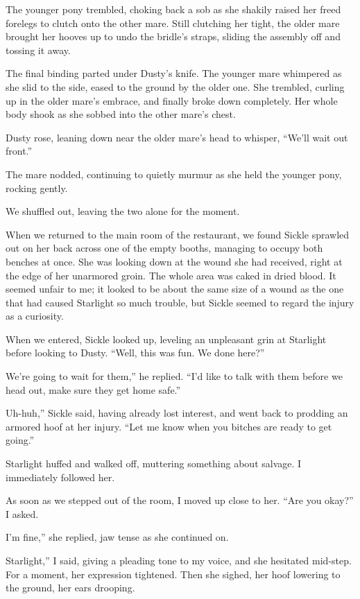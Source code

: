 The younger pony trembled, choking back a sob as she shakily raised her freed forelegs to clutch onto the other mare. Still clutching her tight, the older mare brought her hooves up to undo the bridle’s straps, sliding the assembly off and tossing it away.

The final binding parted under Dusty’s knife. The younger mare whimpered as she slid to the side, eased to the ground by the older one. She trembled, curling up in the older mare’s embrace, and finally broke down completely. Her whole body shook as she sobbed into the other mare’s chest.

Dusty rose, leaning down near the older mare’s head to whisper, “We’ll wait out front.”

The mare nodded, continuing to quietly murmur as she held the younger pony, rocking gently.

We shuffled out, leaving the two alone for the moment.

When we returned to the main room of the restaurant, we found Sickle sprawled out on her back across one of the empty booths, managing to occupy both benches at once. She was looking down at the wound she had received, right at the edge of her unarmored groin. The whole area was caked in dried blood. It seemed unfair to me; it looked to be about the same size of a wound as the one that had caused Starlight so much trouble, but Sickle seemed to regard the injury as a curiosity.

When we entered, Sickle looked up, leveling an unpleasant grin at Starlight before looking to Dusty. “Well, this was fun. We done here?”

\leavevmode{}We’re going to wait for them,” he replied. “I’d like to talk with them before we head out, make sure they get home safe.”

\leavevmode{}Uh-huh,” Sickle said, having already lost interest, and went back to prodding an armored hoof at her injury. “Let me know when you bitches are ready to get going.”

Starlight huffed and walked off, muttering something about salvage. I immediately followed her.

As soon as we stepped out of the room, I moved up close to her. “Are you okay?” I asked.

\leavevmode{}I’m fine,” she replied, jaw tense as she continued on.

\leavevmode{}Starlight,” I said, giving a pleading tone to my voice, and she hesitated mid-step. For a moment, her expression tightened. Then she sighed, her hoof lowering to the ground, her ears drooping.

